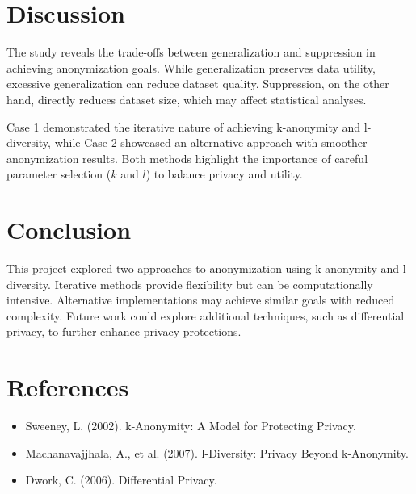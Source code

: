 \documentclass[conference]{IEEEtran}
\begin{document}
	\section{Discussion}
	The study reveals the trade-offs between generalization and suppression in achieving anonymization goals. While generalization preserves data utility, excessive generalization can reduce dataset quality. Suppression, on the other hand, directly reduces dataset size, which may affect statistical analyses.
	
	Case 1 demonstrated the iterative nature of achieving k-anonymity and l-diversity, while Case 2 showcased an alternative approach with smoother anonymization results. Both methods highlight the importance of careful parameter selection ($k$ and $l$) to balance privacy and utility.
	
	\section{Conclusion}
	This project explored two approaches to anonymization using k-anonymity and l-diversity. Iterative methods provide flexibility but can be computationally intensive. Alternative implementations may achieve similar goals with reduced complexity. Future work could explore additional techniques, such as differential privacy, to further enhance privacy protections.
	
	\section*{References}
	\begin{itemize}
		\item Sweeney, L. (2002). k-Anonymity: A Model for Protecting Privacy.
		\item Machanavajjhala, A., et al. (2007). l-Diversity: Privacy Beyond k-Anonymity.
		\item Dwork, C. (2006). Differential Privacy.
	\end{itemize}
	
\end{document}
